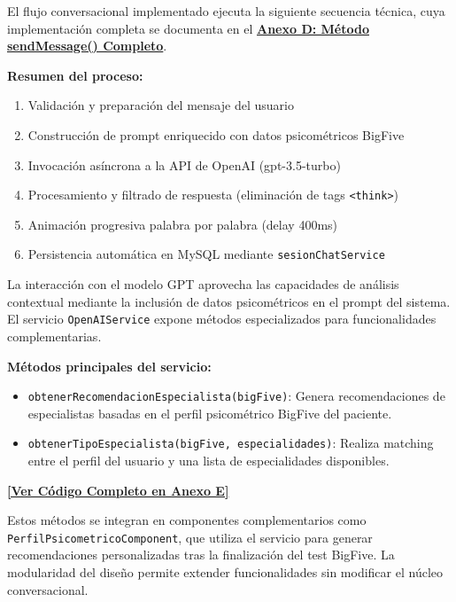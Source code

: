 \documentclass[12pt,a4paper]{report}
\numberwithin{figure}{section}
\begin{document}
El flujo conversacional implementado ejecuta la siguiente secuencia técnica, cuya implementación completa se documenta en el \hyperref[anexo:sendmessage]{\textbf{Anexo D: Método sendMessage() Completo}}.
\label{lst:flujo-ref}

\textbf{Resumen del proceso:}
\begin{enumerate}
  \item Validación y preparación del mensaje del usuario
  \item Construcción de prompt enriquecido con datos psicométricos BigFive
  \item Invocación asíncrona a la API de OpenAI (gpt-3.5-turbo)
  \item Procesamiento y filtrado de respuesta (eliminación de tags \texttt{<think>})
  \item Animación progresiva palabra por palabra (delay 400ms)
  \item Persistencia automática en MySQL mediante \texttt{sesionChatService}
\end{enumerate}

La interacción con el modelo GPT aprovecha las capacidades de análisis contextual mediante la inclusión de datos psicométricos en el prompt del sistema. El servicio \texttt{OpenAIService} expone métodos especializados para funcionalidades complementarias.
\label{lst:openai-service-ref}

\textbf{Métodos principales del servicio:}
\begin{itemize}
  \item \texttt{obtenerRecomendacionEspecialista(bigFive)}: Genera recomendaciones de especialistas basadas en el perfil psicométrico BigFive del paciente.
  \item \texttt{obtenerTipoEspecialista(bigFive, especialidades)}: Realiza matching entre el perfil del usuario y una lista de especialidades disponibles.
\end{itemize}

\vspace{0.5em}
\begin{center}
\hyperref[anexo:openai-service]{\textbf{[Ver Código Completo en Anexo E]}}
\end{center}
\vspace{0.5em}

Estos métodos se integran en componentes complementarios como \texttt{PerfilPsicometricoComponent}, que utiliza el servicio para generar recomendaciones personalizadas tras la finalización del test BigFive. La modularidad del diseño permite extender funcionalidades sin modificar el núcleo conversacional.
\end{document}
